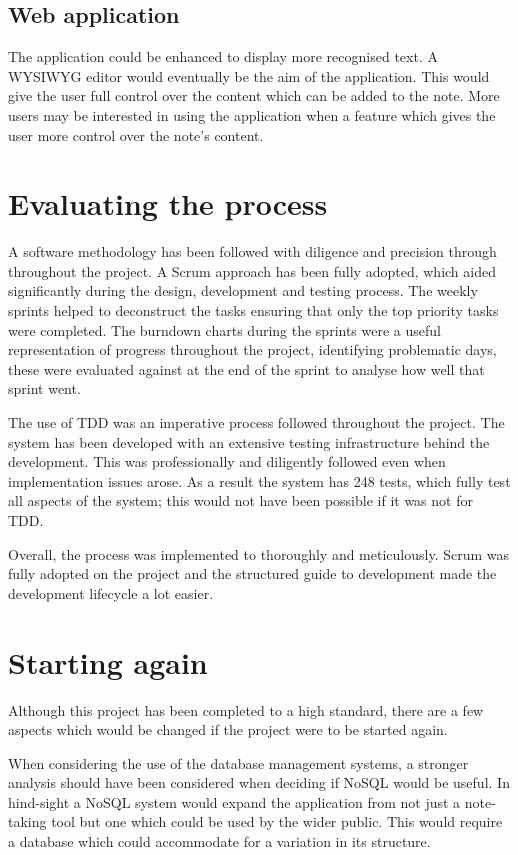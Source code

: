 \subsection{Web application}
The application could be enhanced to display more recognised text. A WYSIWYG editor would eventually be the aim of the application. This would give the user full control over the content which can be added to the note. More users may be interested in using the application when a feature which gives the user more control over the note's content.

\section{Evaluating the process}
A software methodology has been followed with diligence and precision through throughout the project. A Scrum approach has been fully adopted,  which aided significantly during the design, development and testing process. The weekly sprints helped to deconstruct the tasks ensuring that only the top priority tasks were completed. The burndown charts during the sprints were a useful representation of progress throughout the project, identifying problematic days, these were evaluated against at the end of the sprint to analyse how well that sprint went.

The use of TDD was an imperative process followed throughout the project. The system has been developed with an extensive testing infrastructure behind the development. This was professionally and diligently followed even when implementation issues arose. As a result the system has 248 tests, which fully test all aspects of the system; this would not have been possible if it was not for TDD.

Overall, the process was implemented to thoroughly and meticulously. Scrum was fully adopted on the project and the structured guide to development made the development lifecycle a lot easier.

\section{Starting again}
Although this project has been completed to a high standard, there are a few aspects which would be changed if the project were to be started again.

When considering the use of the database management systems, a stronger analysis should have been considered when deciding if NoSQL would be useful. In hind-sight a NoSQL system would expand the application from not just a note-taking tool but one which could be used by the wider public. This would require a database which could accommodate for a variation in its structure.

